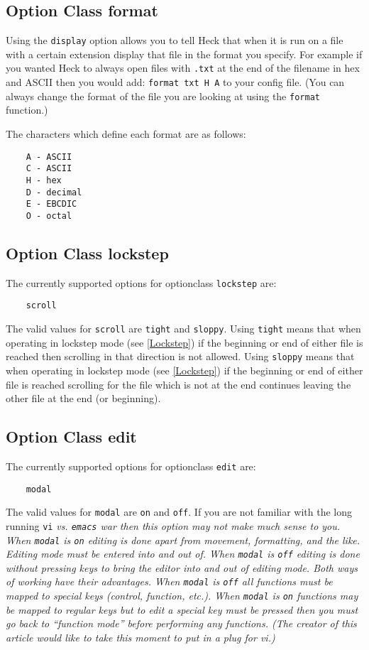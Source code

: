 \documentclass[12pt]{article}
\begin{document}
\subsection{Option Class format}
Using the \verb#display# option allows you to tell Heck that when it is run
on a file with a certain extension display that file in the format you specify.
For example if you wanted Heck to always open files with \verb#.txt# at the 
end of the filename in hex and ASCII then you would add:
\verb#format txt H A# to your config file.  (You can always change the format
of the file you are looking at using the \verb#format# function.)

The characters which define each format are as follows:
\begin{verbatim}
    A - ASCII
    C - ASCII
    H - hex
    D - decimal
    E - EBCDIC
    O - octal
\end{verbatim}

\subsection{Option Class lockstep}
The currently supported options for optionclass \verb#lockstep# are: 
\begin{verbatim}
    scroll
\end{verbatim}

The valid values for \verb#scroll# are \verb#tight# and \verb#sloppy#.  Using 
\verb#tight# means that when operating in lockstep mode (see \ref{Lockstep}) 
if the beginning or end of either file is reached then scrolling in that 
direction is not allowed.  Using \verb#sloppy# means that when operating in 
lockstep mode (see \ref{Lockstep}) if the beginning or end of either file is 
reached scrolling for the file which is not at the end continues leaving the 
other file at the end (or beginning).

\subsection{Option Class edit}
The currently supported options for optionclass \verb#edit# are:
\begin{verbatim}
    modal
\end{verbatim}

The valid values for \verb#modal# are \verb#on# and \verb#off#.  If you are not
familiar with the long running \verb#vi# \it{}vs.\rm{} \verb#emacs# war then
this option may not make much sense to you.  When \verb#modal# is \verb#on#
editing is done apart from movement, formatting, and the like. Editing mode 
must be entered into and out of.  When \verb#modal# is \verb#off# editing is
done without pressing keys to bring the editor into and out of editing mode.
Both ways of working have their advantages.  When \verb#modal# is \verb#off#
all functions must be mapped to special keys (control, function, etc.).  When
\verb#modal# is \verb#on# functions may be mapped to regular keys but to 
edit a special key must be pressed then you must go back to ``function mode''
before performing any functions.  (The creator of this article would like to
take this moment to put in a plug for vi.)
\end{document}
